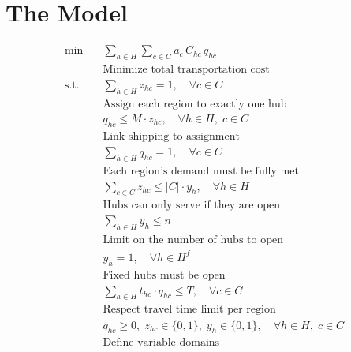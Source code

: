 \documentclass{article}
\begin{document}
\section{The Model}
\begin{align*}
    \min \quad & \sum_{h \in H} \sum_{c \in C} a_c\,C_{hc}\,q_{hc} \\
    & \text{Minimize total transportation cost} \\[6pt]
    \text{s.t.} \quad & \sum_{h \in H} z_{hc} = 1, \quad \forall c \in C \\
    & \text{Assign each region to exactly one hub} \\[6pt]
    & q_{hc} \leq M \cdot z_{hc}, \quad \forall h \in H,\; c \in C \\
    & \text{Link shipping to assignment} \\[6pt]
    & \sum_{h \in H} q_{hc} = 1, \quad \forall c \in C \\
    & \text{Each region's demand must be fully met} \\[6pt]
    & \sum_{c \in C} z_{hc} \leq |C| \cdot y_h, \quad \forall h \in H \\
    & \text{Hubs can only serve if they are open} \\[6pt]
    & \sum_{h \in H} y_h \leq n \\
    & \text{Limit on the number of hubs to open} \\[6pt]
    & y_h = 1, \quad \forall h \in H^f \\
    & \text{Fixed hubs must be open} \\[6pt]
    & \sum_{h \in H} t_{hc} \cdot q_{hc} \leq T, \quad \forall c \in C \\
    & \text{Respect travel time limit per region} \\[6pt]
    & q_{hc} \geq 0,\; z_{hc} \in \{0,1\},\; y_h \in \{0,1\}, \quad \forall h \in H,\; c \in C \\
    & \text{Define variable domains}
\end{align*}
\end{document}
